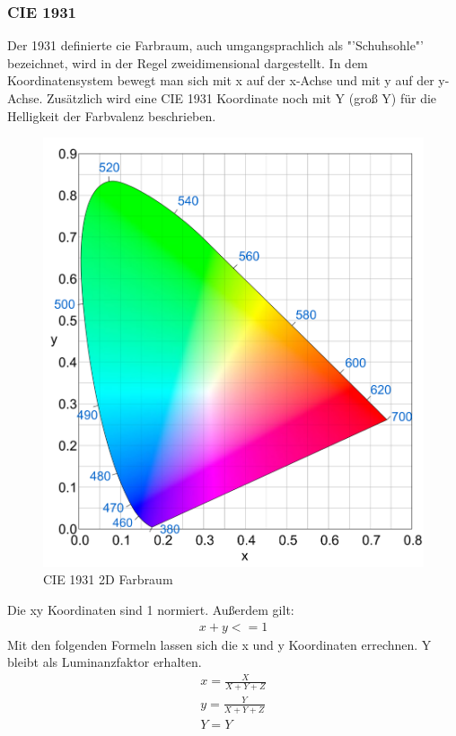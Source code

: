 \documentclass[11pt]{scrartcl}
\begin{document}
\subsubsection{CIE 1931}
Der 1931 definierte \ac{cie} Farbraum, auch umgangsprachlich als "'Schuhsohle"' bezeichnet, wird in der Regel zweidimensional dargestellt.
In dem Koordinatensystem bewegt man sich mit x auf der x-Achse und mit y auf der y-Achse. Zusätzlich wird eine CIE 1931 Koordinate noch mit
Y (groß Y) für die Helligkeit der Farbvalenz beschrieben.
\begin{figure}[H]
    \begin{center}
        \includegraphics[width=.7\textwidth]{images/cie_1931.png}
    \end{center}
    \vspace{-.7cm}
    \caption[CIE 1931 2D Farbraum]{CIE 1931 2D Farbraum \cite{wikipedia1931Image}}
\end{figure}
\noindent
Die xy Koordinaten sind 1 normiert. Außerdem gilt:
\begin{align}
    x + y <= 1
\end{align}
Mit den folgenden Formeln lassen sich die x und y Koordinaten errechnen. Y bleibt als Luminanzfaktor erhalten.
\begin{align}\label{Equ:7}
    x = \frac{X}{X+Y+Z}\\
    y = \frac{Y}{X+Y+Z}\\
    Y = Y \label{Equ:8}
\end{align}
\cite{lindbloom}
\end{document}
